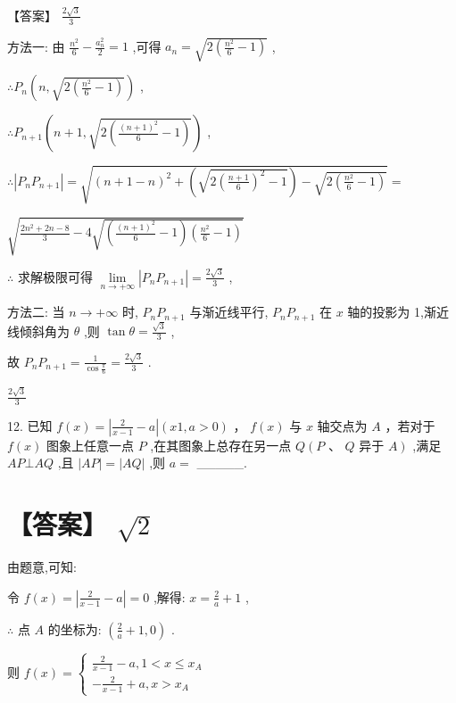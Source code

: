 \documentclass[10pt]{article}
\begin{document}
【答案】 \(\frac{2\sqrt{3}}{3}\)

方法一: 由 \(\frac{{n}^{2}}{6} - \frac{{a}_{n}^{2}}{2} = 1\) ,可得 \({a}_{n} = \sqrt{2\left( {\frac{{n}^{2}}{6} - 1}\right) }\) ,

\(\therefore {P}_{n}\left( {n,\sqrt{2\left( {\frac{{n}^{2}}{6} - 1}\right) }}\right)\) ,

\(\therefore {P}_{n + 1}\left( {n + 1,\sqrt{2\left( {\frac{{\left( n + 1\right) }^{2}}{6} - 1}\right) }}\right)\) ,

\(\therefore \left| {{P}_{n}{P}_{n + 1}}\right|  = \sqrt{{\left( n + 1 - n\right) }^{2} + \left( \sqrt{2{\left( \frac{n + 1}{6}\right) }^{2} - 1}\right)  - \sqrt{2\left( {\frac{{n}^{2}}{6} - 1}\right) }} =\)

\(\sqrt{\frac{2{n}^{2} + {2n} - 8}{3} - 4\sqrt{\left( {\frac{{\left( n + 1\right) }^{2}}{6} - 1}\right) \left( {\frac{{n}^{2}}{6} - 1}\right) }}\)

\(\therefore\) 求解极限可得 \(\mathop{\lim }\limits_{{n \rightarrow   + \infty }}\left| {{P}_{n}{P}_{n + 1}}\right|  = \frac{2\sqrt{3}}{3}\) ,

方法二: 当 \(n \rightarrow   + \infty\) 时, \({P}_{n}{P}_{n + 1}\) 与渐近线平行, \({P}_{n}{P}_{n + 1}\) 在 \(x\) 轴的投影为 1,渐近线倾斜角为 \(\theta\) ,则 \(\tan \theta  = \frac{\sqrt{3}}{3}\) ,

故 \({P}_{n}{P}_{n + 1} = \frac{1}{\cos \frac{\pi }{6}} = \frac{2\sqrt{3}}{3}\) .

\(\frac{2\sqrt{3}}{3}\)

12. 已知 \(f\left( x\right)  = \left| {\frac{2}{x - 1} - a}\right| \left( {{x1},a > 0}\right)\) ， \(f\left( x\right)\) 与 \(x\) 轴交点为 \(A\) ，若对于 \(f\left( x\right)\) 图象上任意一点 \(P\) ,在其图象上总存在另一点 \(Q\left( {P\text{ 、 }Q\text{ 异于 }A}\right)\) ,满足 \({AP} \bot  {AQ}\) ,且 \(\left| {AP}\right|  = \left| {AQ}\right|\) ,则 \(a =\) \_\_\_\_\_.

\section*{【答案】 \(\sqrt{2}\)}

由题意,可知:

令 \(f\left( x\right)  = \left| {\frac{2}{x - 1} - a}\right|  = 0\) ,解得: \(x = \frac{2}{a} + 1\) ,

\(\therefore\) 点 \(A\) 的坐标为: \(\left( {\frac{2}{a} + 1,0}\right)\) .

则 \(f\left( x\right)  = \left\{  \begin{array}{l} \frac{2}{x - 1} - a,1 < x \leq  {x}_{A} \\   - \frac{2}{x - 1} + a,x > {x}_{A} \end{array}\right.\)
\end{document}
